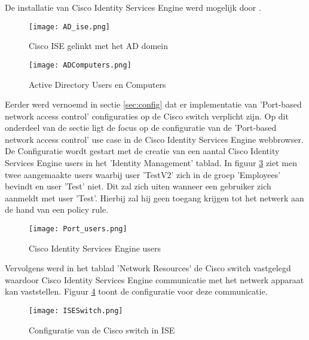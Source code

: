 De installatie van Cisco Identity Services Engine werd mogelijk door \cite{CiscoISE_InstallationGuide}.

\begin{figure}[H]
	\centering
	\texttt{[image: AD\_ise.png]}
	\caption{Cisco ISE gelinkt met het AD domein}%
	\label{fig:AD_Cisco1}%
\end{figure}

\begin{figure}[H]
	\centering
	\texttt{[image: ADComputers.png]}
	\caption{Active Directory Users en Computers}
	\label{fig:AD_Cisco2}
\end{figure}
 \newline
	Eerder werd vernoemd in sectie \ref{sec:config} dat er implementatie van 'Port-based network access control' configuraties op de Cisco switch verplicht zijn. Op dit onderdeel van de sectie ligt de focus op de configuratie van de 'Port-based network access control' use case in de Cisco Identity Services Engine webbrowser. 
	\newline
	\newline
	De Configuratie wordt gestart met de creatie van een aantal Cisco Identity Services Engine users in het 'Identity Management' tablad. In figuur \ref{fig:users} ziet men twee aangemaakte users waarbij user 'TestV2' zich in de groep 'Employees' bevindt en user 'Test' niet. Dit zal zich uiten wanneer een gebruiker zich aanmeldt met user 'Test'. Hierbij zal hij geen toegang krijgen tot het netwerk aan de hand van een policy rule.

	
 	\begin{figure}[H]
 		\centering
 		\texttt{[image: Port\_users.png]}
 		\caption{Cisco Identity Services Engine users}%
 		\label{fig:users}%
 	\end{figure}
 	
 	Vervolgens werd in het tablad 'Network Resources' de Cisco switch vastgelegd waardoor Cisco Identity Services Engine communicatie met het netwerk apparaat kan vaststellen. Figuur \ref{fig:ISESwitch} toont de configuratie voor deze communicatie. 
 	
 	 	\begin{figure}[H]
 		\centering
 		\texttt{[image: ISESwitch.png]}
 		\caption{Configuratie van de Cisco switch in ISE}%
 		\label{fig:ISESwitch}%
 		\end{figure}
 	
